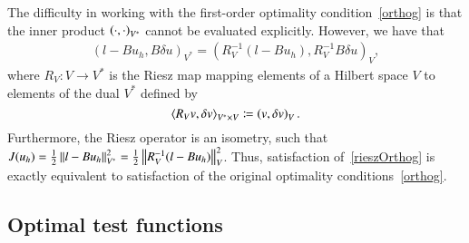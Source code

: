 The difficulty in working with the first-order optimality condition~\eqref{orthog} is that the inner product $\LRp{\cdot,\cdot}_{V^*}$ cannot be evaluated explicitly.  However, we have that 
\begin{align}
\left(l-Bu_h,B\delta u\right)_{V^*} = \left(R_V^{-1}(l-Bu_h),R_V^{-1}B\delta u\right)_{V},
\label{rieszOrthog}
\end{align}
where $R_V: V\rightarrow V^*$ is the Riesz map mapping elements of a Hilbert space $V$ to elements of the dual $V^*$ defined by
\[
\LRa{R_Vv,\delta v}_{V^*\times V} \coloneqq \LRp{v,\delta v}_V.
\]
Furthermore, the Riesz operator is an isometry, such that $J(u_h) = \frac{1}{2}\nor{l-Bu_h}^2_{V^*} = \frac{1}{2}\nor{R_V^{-1}(l-Bu_h)}^2_{V}$.  Thus, satisfaction of~\eqref{rieszOrthog} is exactly equivalent to satisfaction of the original optimality conditions~\eqref{orthog}.  

\subsection{Optimal test functions}

